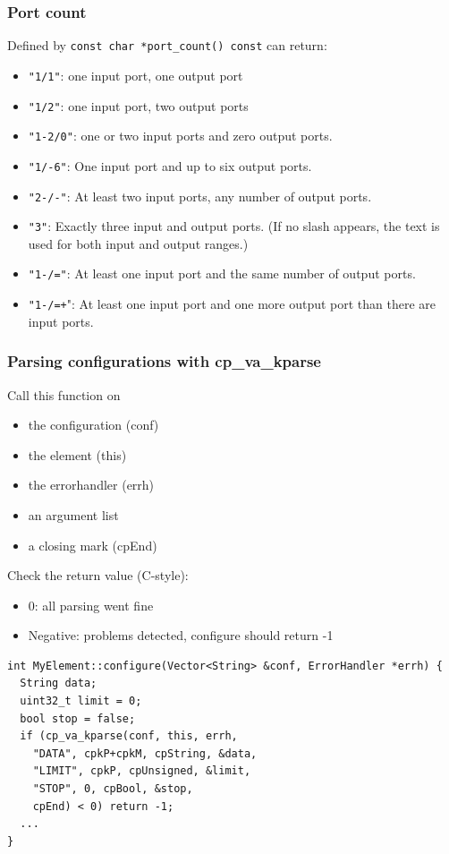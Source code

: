 \documentclass{beamer}
\begin{document}
\begin{frame}[fragile]
\frametitle{Port count}
Defined by \lstinline!const char *port_count() const! can return:
\begin{itemize}
	\item \lstinline!"1/1"!: one input port, one output port
	\item \lstinline!"1/2"!: one input port, two output ports
	\item \lstinline!"1-2/0"!: one or two input ports and zero output ports. 
	\item \lstinline!"1/-6"!: One input port and up to six output ports. 
	\item \lstinline!"2-/-"!: At least two input ports, any number of output ports. 
	\item \lstinline!"3"!: Exactly three input and output ports. (If no slash appears, the text is used for both input and output ranges.) 
	\item \lstinline!"1-/="!: At least one input port and the same number of output ports. 
	\item \lstinline!"1-/=+!": At least one input port and one more output port than there are input ports.
\end{itemize}
\end{frame}


\begin{frame}
\frametitle{Parsing configurations with cp\_va\_kparse}
Call this function on
\begin{itemize}
	\item the configuration (conf)
	\item the element (this) 
	\item the errorhandler (errh)
	\item an argument list
	\item a closing mark (cpEnd)
\end{itemize}
Check the return value (C-style):
\begin{itemize}
	\item 0: all parsing went fine
	\item Negative: problems detected, configure should return -1
\end{itemize}

\begin{lstlisting}[basicstyle=\footnotesize]
int MyElement::configure(Vector<String> &conf, ErrorHandler *errh) {
  String data;
  uint32_t limit = 0;
  bool stop = false;
  if (cp_va_kparse(conf, this, errh, 
    "DATA", cpkP+cpkM, cpString, &data, 
    "LIMIT", cpkP, cpUnsigned, &limit, 
    "STOP", 0, cpBool, &stop, 
    cpEnd) < 0) return -1;
  ...
}
\end{lstlisting}
\end{frame}
\end{document}

